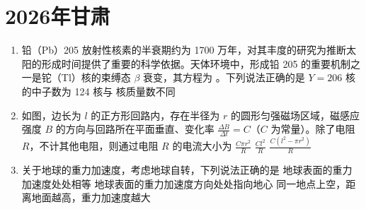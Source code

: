 \documentclass[\gkver]{gaokaozhenti}
\begin{document}
\chapter{2026年甘肃}

\begin{enumerate}
\item
铅（Pb）205 放射性核素的半衰期约为 1700 万年，对其丰度的研究为推断太阳的形成时间提供了重要的科学依据。天体环境中，形成铅 205 的重要机制之一是铊（Tl）核的束缚态 $\beta$ 衰变，其方程为 。下列说法正确的是 
{$Y = 206$}
{ 核的中子数为 124}
{ 核与  核质量数不同}


\item
如图，边长为 $l$ 的正方形回路内，存在半径为 $r$ 的圆形匀强磁场区域，磁感应强度 $B$ 的方向与回路所在平面垂直、变化率 $\frac{\Delta B}{\Delta t}=C$（$C$ 为常量）。除了电阻 $R$，不计其他电阻，则通过电阻 $R$ 的电流大小为 
{$\frac{C\pi r^{2}}{R}$}
{$\frac{Cl^{2}}{R}$}
{$\frac{C(l^{2}-\pi r^{2})}{R}$}


\item
关于地球的重力加速度，考虑地球自转，下列说法正确的是 
{地球表面的重力加速度处处相等}
{地球表面的重力加速度方向处处指向地心}
{同一地点上空，距离地面越高，重力加速度越大}


\end{enumerate}
\end{document}

